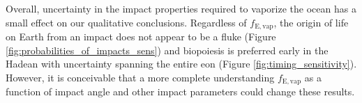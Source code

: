 \documentclass{aastex631}
\begin{document}
Overall, uncertainty in the impact properties required to vaporize the ocean has a small effect on our qualitative conclusions. Regardless of $f_\mathrm{E,vap}$, the origin of life on Earth from an impact does not appear to be a fluke (Figure \ref{fig:probabilities_of_impacts_sens}) and biopoiesis is preferred early in the Hadean with uncertainty spanning the entire eon (Figure \ref{fig:timing_sensitivity}). However, it is conceivable that a more complete understanding $f_\mathrm{E,vap}$ as a function of impact angle and other impact parameters could change these results.



\end{document}
